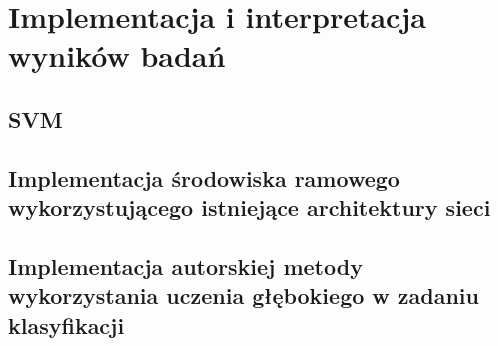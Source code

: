 \chapter{Implementacja i interpretacja wyników badań}

\section{SVM}

\section{Implementacja środowiska ramowego wykorzystującego istniejące architektury sieci}

\section{Implementacja autorskiej metody wykorzystania uczenia głębokiego w zadaniu klasyfikacji}